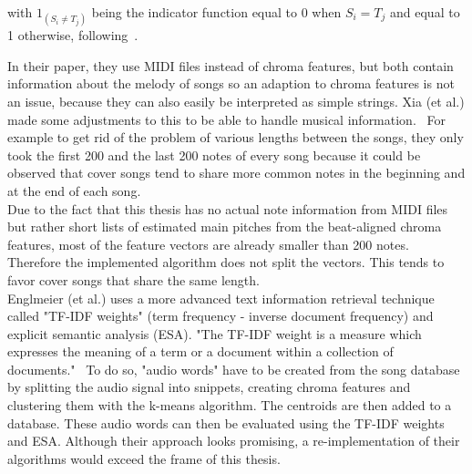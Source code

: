 \noindent with $1_{(S_i \neq T_j)}$ being the indicator function equal to 0 when $S_{i} = T_{j}$ and equal to 1 otherwise, following~\cite[p. 7]{chroma4}.

\noindent In their paper, they use MIDI files instead of chroma features, but both contain information about the melody of songs so an adaption to chroma features is not an issue, because they can also easily be interpreted as simple strings. 
\noindent Xia (et al.) made some adjustments to this to be able to handle musical information.~\cite[pp. 7ff]{chroma4} For example to get rid of the problem of various lengths between the songs, they only took the first 200 and the last 200 notes of every song because it could be observed that cover songs tend to share more common notes in the beginning and at the end of each song.\\
Due to the fact that this thesis has no actual note information from MIDI files but rather short lists of estimated main pitches from the beat-aligned chroma features, most of the feature vectors are already smaller than 200 notes. Therefore the implemented algorithm does not split the vectors. This tends to favor cover songs that share the same length. 
\ \\
Englmeier (et al.) uses a more advanced text information retrieval technique called "TF-IDF weights" (term frequency - inverse document frequency) and explicit semantic analysis (ESA). "The TF-IDF weight is a measure which expresses the meaning of a term or a document within a collection of documents."~\cite[p. 186]{chroma1}
To do so, "audio words" have to be created from the song database by splitting the audio signal into snippets, creating chroma features and clustering them with the k-means algorithm. The centroids are then added to a database. These audio words can then be evaluated using the TF-IDF weights and ESA.
Although their approach looks promising, a re-implementation of their algorithms would exceed the frame of this thesis.

